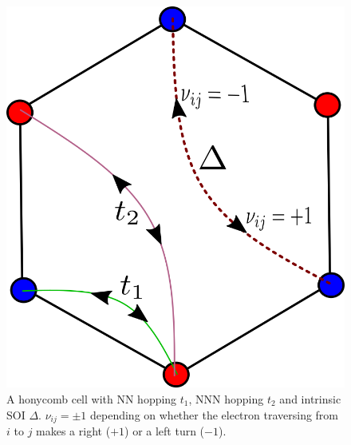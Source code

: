 \documentclass[aps,prl,twocolumn,amsmath,amssymb,nobibnotes]{revtex4-1}%
\begin{document}
\begin{figure}[t]
\centering
\includegraphics[width=0.6\columnwidth]{kmh.png}
\caption{A honycomb cell with NN hopping $t_1$, NNN hopping $t_2$ and intrinsic SOI $\Delta$. $\nu_{ij} = \pm 1$ depending on whether the electron traversing from $i$ to $j$ makes a right ($+1$) or a left turn ($-1$).}
\label{fig1}
\vspace*{-6pt}
\end{figure}
\end{document}
